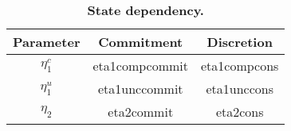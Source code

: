 \documentclass[9pt]{article}
\begin{document}
\begin{table}[!t]
\captionsetup{justification=centering}
\caption{\textbf{State dependency.}}
\centering
\begin{tabular}{c|cc}
\hline
\hline
Parameter & Commitment & Discretion \\
\hline
$\eta^c_1$ & eta1compcommit & eta1compcons\\
$\eta^u_1$ & eta1unccommit & eta1unccons \\
$\eta_2$ & eta2commit & eta2cons\\
\hline
\end{tabular}
\captionsetup{justification=justified}
\label{tab:calibration}
\end{table}
\end{document}
